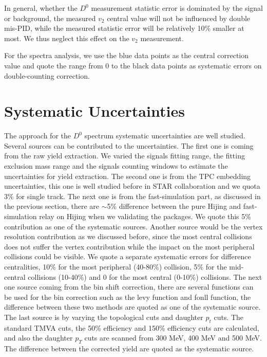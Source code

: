 \documentclass[a4paper]{article}
\begin{document}
In general, whether the $D^0$ measurement statistic error is dominated by the signal or background, the measured $v_2$ central value will not be influenced by double mis-PID, while the measured statistic error will be relatively 10\% smaller at most. We thus neglect this effect on the $v_2$ measurement. 

For the spectra analysis, we use the blue data points as the central correction value and quote the range from 0 to the black data points as systematic errors on double-counting correction.


\section{\label{systematic}Systematic Uncertainties}

The approach for the $D^0$ spectrum systematic uncertainties are well studied. Several sources can be contributed to the uncertainties. The first one is coming from the raw yield extraction. We varied the signals fitting range, the fitting exclusion mass range and the signals counting windows to estimate the uncertainties for yield extraction. The second one is from the TPC embedding uncertainties, this one is well studied before in STAR collaboration and we quota 3\% for single track. The next one is from the fast-simulation part, as discussed in the previous section, there are $\sim$5\% difference between the pure Hijing and fast-simulation relay on Hijing when we validating the packages. We quote this 5\% contribution as one of the systematic sources. Another source would be the vertex resolution contribution as we discussed before, since the most central collisions does not suffer the vertex contribution while the impact on the most peripheral collisions could be visible. We quote a separate systematic errors for difference centralities, 10\% for the most peripheral (40-80\%) collision, 5\% for the mid-central collisions (10-40\%) and 0 for the most central (0-10\%) collisions. The next one source coming from the bin shift correction, there are several functions can be used for the bin correction such as the levy function and fonll function, the difference between these two methods are quoted as one of the systematic source. The last source is by varying the topological cuts and daughter $p_t$ cuts. The standard TMVA cuts, the 50\% efficiency and 150\% efficiency cuts are calculated, and also the daughter $p_T$ cuts are scanned from 300 MeV, 400 MeV and 500 MeV. The difference between the corrected yield are quoted as the systematic source.
\end{document}
